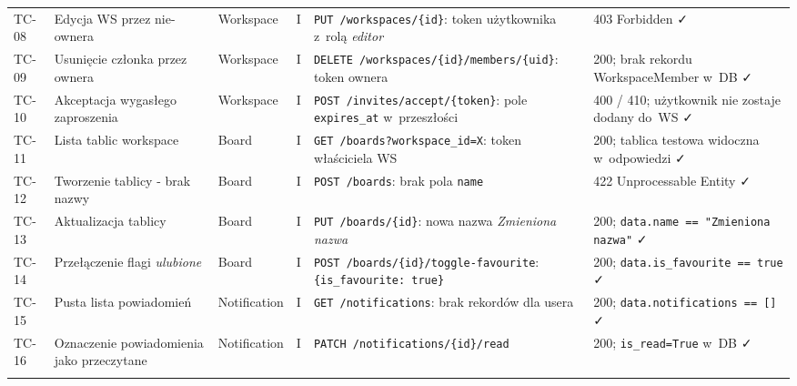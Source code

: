 \documentclass[12pt,a4paper]{article}
\begin{document}
\begin{longtable}{p{1cm} p{3cm} p{1.4cm} p{0.7cm} p{4.5cm} p{4.5cm}}
TC-08 & Edycja WS przez nie-ownera & Workspace & I &
  \texttt{PUT /workspaces/\{id\}}: token użytkownika z~rolą \emph{editor} &
  403 Forbidden \faCheck \\
\addlinespace

TC-09 & Usunięcie członka przez ownera & Workspace & I &
  \texttt{DELETE /workspaces/\{id\}/}\newline\texttt{members/\{uid\}}: token ownera &
  200; brak rekordu WorkspaceMember w~DB \faCheck \\
\addlinespace

TC-10 & Akceptacja wygasłego zaproszenia & Workspace & I &
  \texttt{POST /invites/accept/\{token\}}: pole \texttt{expires\_at} w~przeszłości &
  400 / 410; użytkownik nie zostaje dodany do~WS \faCheck \\
\addlinespace

\midrule

TC-11 & Lista tablic workspace & Board & I &
  \texttt{GET /boards?workspace\_id=X}: token właściciela WS &
  200; tablica testowa widoczna w~odpowiedzi \faCheck \\
\addlinespace

TC-12 & Tworzenie tablicy - brak nazwy & Board & I &
  \texttt{POST /boards}: brak pola \texttt{name} &
  422 Unprocessable Entity \faCheck \\
\addlinespace

TC-13 & Aktualizacja tablicy & Board & I &
  \texttt{PUT /boards/\{id\}}: nowa nazwa \emph{Zmieniona nazwa} &
  200; \texttt{data.name == "Zmieniona nazwa"} \faCheck \\
\addlinespace

TC-14 & Przełączenie flagi \emph{ulubione} & Board & I &
  \texttt{POST /boards/\{id\}/}\newline\texttt{toggle-favourite}: \texttt{\{is\_favourite: true\}} &
  200; \texttt{data.is\_favourite == true} \faCheck \\
\addlinespace

\midrule

TC-15 & Pusta lista powiadomień & Notification & I &
  \texttt{GET /notifications}: brak rekordów dla usera &
  200; \texttt{data.notifications == []} \faCheck \\
\addlinespace

TC-16 & Oznaczenie powiadomienia jako przeczytane & Notification & I &
  \texttt{PATCH /notifications/\{id\}/read} &
  200; \texttt{is\_read=True} w~DB \faCheck \\
\addlinespace


\end{longtable}
\end{document}
